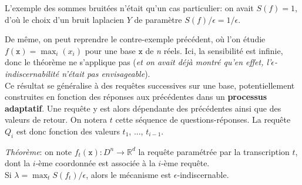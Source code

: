 \documentclass[a4paper,11pt]{article} %
\begin{document}
L'exemple des sommes bruitées n'était qu'un cas particulier: on avait $S(f)=1$, d'où le choix d'un bruit laplacien $Y$ de paramètre $S(f)/\epsilon = 1/\epsilon$.

De même, on peut reprendre le contre-exemple précédent, où l'on étudie $f(\mathtt{x})=\max_i(x_i)$ pour une base $\mathtt{x}$ de \textit{n} réels. Ici, la sensibilité est infinie, donc le théorème ne s'applique pas (\emph{et on avait déjà montré qu'en effet, l'$\epsilon$-indiscernabilité n'était pas envisageable}).\\[-0.4em]

Ce résultat se généralise à des requêtes successives sur une base, potentiellement construites en fonction des réponses aux précédentes dans un \textbf{processus adaptatif}.
Une requête y est alors dépendante des précédentes ainsi que des valeurs de retour.
On notera $t$ cette séquence de questions-réponses. La requête $Q_i$ est donc fonction des valeurs $t_1$, ..., $t_{i-1}$.

\emph{Théorème}: on note $f_t(\mathtt{x}): D^n\longrightarrow\mathbb{R}^d$ la requête paramétrée par la transcription $t$, dont la $i$-ème coordonnée est associée à la $i$-ème requête.\\ 
Si $\lambda = \max_t S(f_t)/\epsilon$, alors le mécanisme  est $\epsilon$-indiscernable.\\[-0.4em]

\end{document}
